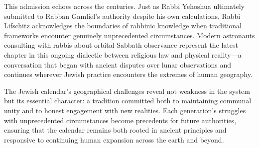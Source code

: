 This admission echoes across the centuries. Just as Rabbi Yehoshua ultimately submitted to Rabban Gamliel's authority despite his own calculations, Rabbi Lifschitz acknowledges the boundaries of rabbinic knowledge when traditional frameworks encounter genuinely unprecedented circumstances. Modern astronauts consulting with rabbis about orbital Sabbath observance represent the latest chapter in this ongoing dialectic between religious law and physical reality—a conversation that began with ancient disputes over lunar observations and continues wherever Jewish practice encounters the extremes of human geography.

The Jewish calendar's geographical challenges reveal not weakness in the system but its essential character: a tradition committed both to maintaining communal unity and to honest engagement with new realities. Each generation's struggles with unprecedented circumstances become precedents for future authorities, ensuring that the calendar remains both rooted in ancient principles and responsive to continuing human expansion across the earth and beyond.

\vspace{2em}
